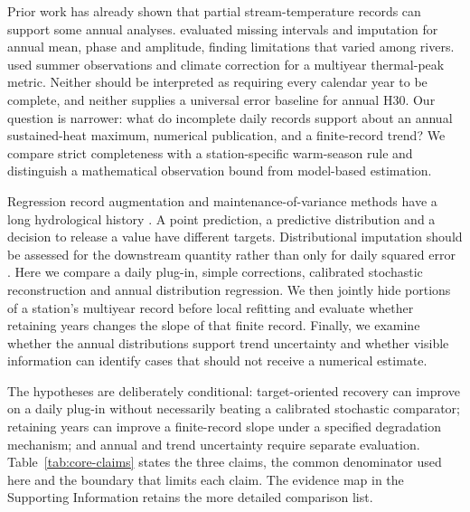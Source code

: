 \documentclass[draft,linenumbers]{agujournal2025}
\begin{document}
Prior work has already shown that partial stream-temperature records can support some annual analyses.  evaluated missing intervals and imputation for annual mean, phase and amplitude, finding limitations that varied among rivers.  used summer observations and climate correction for a multiyear thermal-peak metric. Neither should be interpreted as requiring every calendar year to be complete, and neither supplies a universal error baseline for annual H30. Our question is narrower: what do incomplete daily records support about an annual sustained-heat maximum, numerical publication, and a finite-record trend? We compare strict completeness with a station-specific warm-season rule and distinguish a mathematical observation bound from model-based estimation.

Regression record augmentation and maintenance-of-variance methods have a long hydrological history \cite{matalas1964,hirsch1982,vogel1985}. A point prediction, a predictive distribution and a decision to release a value have different targets. Distributional imputation should be assessed for the downstream quantity rather than only for daily squared error \cite{naf2023,gneiting2007}. Here we compare a daily plug-in, simple corrections, calibrated stochastic reconstruction and annual distribution regression. We then jointly hide portions of a station's multiyear record before local refitting and evaluate whether retaining years changes the slope of that finite record. Finally, we examine whether the annual distributions support trend uncertainty and whether visible information can identify cases that should not receive a numerical estimate.

The hypotheses are deliberately conditional: target-oriented recovery can improve on a daily plug-in without necessarily beating a calibrated stochastic comparator; retaining years can improve a finite-record slope under a specified degradation mechanism; and annual and trend uncertainty require separate evaluation. Table~\ref{tab:core-claims} states the three claims, the common denominator used here and the boundary that limits each claim. The evidence map in the Supporting Information retains the more detailed comparison list.

\end{document}

